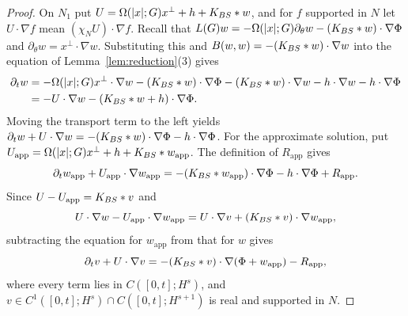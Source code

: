 \begin{proof}
On $N_1$ put $U=\Omega(|x|;G)x^\perp+h+K_{BS}\ast w$, and for $f$ supported in $N$ let
$U\cdot\nabla f$ mean $(\chi_NU)\cdot\nabla f$.
Recall that $L(G)w=-\Omega(|x|;G)\partial_\theta w-(K_{BS}\ast w)\cdot\nabla\Phi$
and $\partial_\theta w=x^\perp\cdot\nabla w$. Substituting this and
$B(w,w)=-(K_{BS}\ast w)\cdot\nabla w$ into the equation of
Lemma~\ref{lem:reduction}\textup{(3)} gives
\[
\begin{aligned}
\partial_tw
&=-\Omega(|x|;G)x^\perp\cdot\nabla w-(K_{BS}\ast w)\cdot\nabla\Phi
  -(K_{BS}\ast w)\cdot\nabla w-h\cdot\nabla w-h\cdot\nabla\Phi\\
&=-U\cdot\nabla w-(K_{BS}\ast w+h)\cdot\nabla\Phi.
\end{aligned}
\]
Moving the transport term to the left yields
$\partial_tw+U\cdot\nabla w=-(K_{BS}\ast w)\cdot\nabla\Phi-h\cdot\nabla\Phi$.
For the approximate solution, put
$U_{\mathrm{app}}=\Omega(|x|;G)x^\perp+h+K_{BS}\ast w_{\mathrm{app}}$.
The definition of $R_{\mathrm{app}}$ gives
\[
\partial_tw_{\mathrm{app}}+U_{\mathrm{app}}\cdot\nabla w_{\mathrm{app}}
=-(K_{BS}\ast w_{\mathrm{app}})\cdot\nabla\Phi-h\cdot\nabla\Phi+R_{\mathrm{app}}.
\]
Since $U-U_{\mathrm{app}}=K_{BS}\ast v$ and
\[
U\cdot\nabla w-U_{\mathrm{app}}\cdot\nabla w_{\mathrm{app}}
=U\cdot\nabla v+(K_{BS}\ast v)\cdot\nabla w_{\mathrm{app}},
\]
subtracting the equation for $w_{\mathrm{app}}$ from that for $w$ gives
\[
\partial_tv+U\cdot\nabla v=-(K_{BS}\ast v)\cdot\nabla(\Phi+w_{\mathrm{app}})-R_{\mathrm{app}},
\]
where every term lies in $C([0,t];H^s)$, and
$v\in C^1([0,t];H^s)\cap C([0,t];H^{s+1})$ is real and supported in $N$.


\end{proof}
